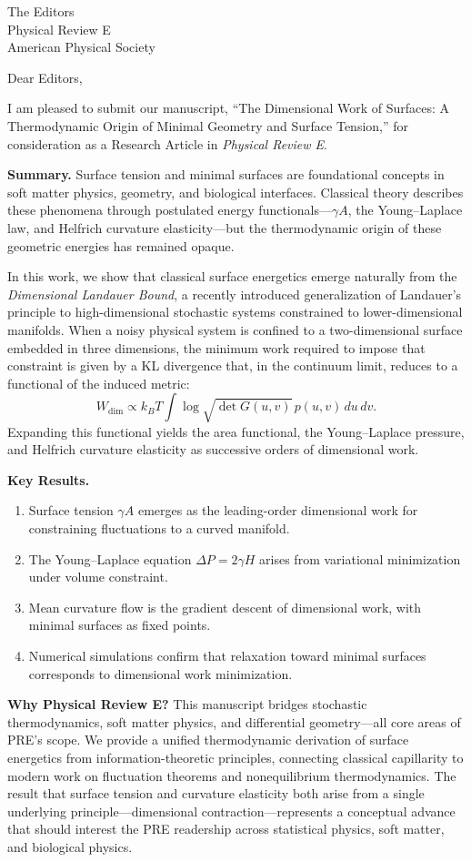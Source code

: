 \documentclass[11pt]{letter}
\begin{document}
\begin{letter}{The Editors\\Physical Review E\\American Physical Society}

\opening{Dear Editors,}

I am pleased to submit our manuscript, ``The Dimensional Work of Surfaces: A Thermodynamic Origin of Minimal Geometry and Surface Tension,'' for consideration as a Research Article in \textit{Physical Review E}.

\textbf{Summary.} Surface tension and minimal surfaces are foundational concepts in soft matter physics, geometry, and biological interfaces. Classical theory describes these phenomena through postulated energy functionals---$\gamma A$, the Young--Laplace law, and Helfrich curvature elasticity---but the thermodynamic origin of these geometric energies has remained opaque.

In this work, we show that classical surface energetics emerge naturally from the \emph{Dimensional Landauer Bound}, a recently introduced generalization of Landauer's principle to high-dimensional stochastic systems constrained to lower-dimensional manifolds. When a noisy physical system is confined to a two-dimensional surface embedded in three dimensions, the minimum work required to impose that constraint is given by a KL divergence that, in the continuum limit, reduces to a functional of the induced metric:
\[
W_{\mathrm{dim}} \propto k_B T \int \log\sqrt{\det G(u,v)}\, p(u,v)\,du\,dv.
\]
Expanding this functional yields the area functional, the Young--Laplace pressure, and Helfrich curvature elasticity as successive orders of dimensional work.

\textbf{Key Results.}
\begin{enumerate}
\item Surface tension $\gamma A$ emerges as the leading-order dimensional work for constraining fluctuations to a curved manifold.
\item The Young--Laplace equation $\Delta P = 2\gamma H$ arises from variational minimization under volume constraint.
\item Mean curvature flow is the gradient descent of dimensional work, with minimal surfaces as fixed points.
\item Numerical simulations confirm that relaxation toward minimal surfaces corresponds to dimensional work minimization.
\end{enumerate}

\textbf{Why Physical Review E?} This manuscript bridges stochastic thermodynamics, soft matter physics, and differential geometry---all core areas of PRE's scope. We provide a unified thermodynamic derivation of surface energetics from information-theoretic principles, connecting classical capillarity to modern work on fluctuation theorems and nonequilibrium thermodynamics. The result that surface tension and curvature elasticity both arise from a single underlying principle---dimensional contraction---represents a conceptual advance that should interest the PRE readership across statistical physics, soft matter, and biological physics.


\end{letter}
\end{document}

